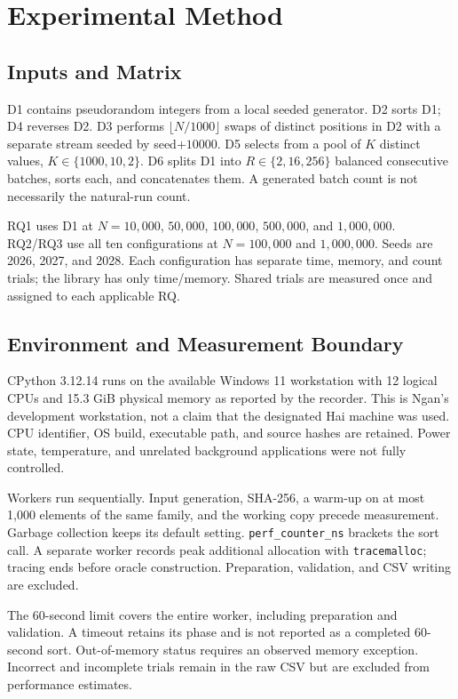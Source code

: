 \documentclass[conference]{IEEEtran}
\begin{document}
\section{Experimental Method}
\subsection{Inputs and Matrix}
D1 contains pseudorandom integers from a local seeded generator. D2 sorts D1; D4 reverses D2. D3 performs $\lfloor N/1000\rfloor$ swaps of distinct positions in D2 with a separate stream seeded by seed$+10000$. D5 selects from a pool of $K$ distinct values, $K\in\{1000,10,2\}$. D6 splits D1 into $R\in\{2,16,256\}$ balanced consecutive batches, sorts each, and concatenates them. A generated batch count is not necessarily the natural-run count.

RQ1 uses D1 at $N=10{,}000$, $50{,}000$, $100{,}000$, $500{,}000$, and $1{,}000{,}000$. RQ2/RQ3 use all ten configurations at $N=100{,}000$ and $1{,}000{,}000$. Seeds are 2026, 2027, and 2028. Each configuration has separate time, memory, and count trials; the library has only time/memory. Shared trials are measured once and assigned to each applicable RQ.

\subsection{Environment and Measurement Boundary}
CPython 3.12.14 runs on the available Windows 11 workstation with 12 logical CPUs and 15.3 GiB physical memory as reported by the recorder. This is Ngan's development workstation, not a claim that the designated Hai machine was used. CPU identifier, OS build, executable path, and source hashes are retained. Power state, temperature, and unrelated background applications were not fully controlled.

Workers run sequentially. Input generation, SHA-256, a warm-up on at most 1,000 elements of the same family, and the working copy precede measurement. Garbage collection keeps its default setting. \texttt{perf\_counter\_ns} brackets the sort call. A separate worker records peak additional allocation with \texttt{tracemalloc}; tracing ends before oracle construction. Preparation, validation, and CSV writing are excluded.

The 60-second limit covers the entire worker, including preparation and validation. A timeout retains its phase and is not reported as a completed 60-second sort. Out-of-memory status requires an observed memory exception. Incorrect and incomplete trials remain in the raw CSV but are excluded from performance estimates.
\end{document}
